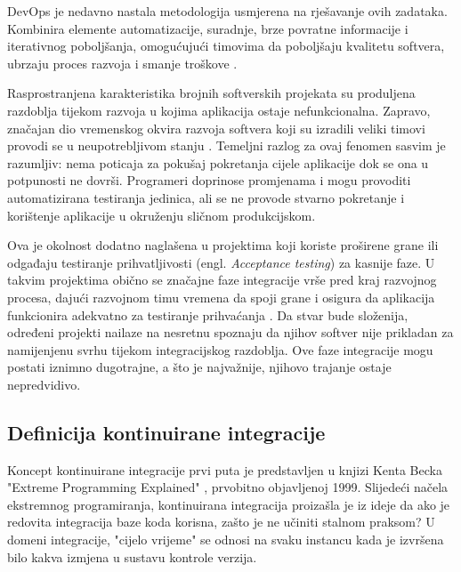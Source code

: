 \documentclass[a4paper,12pt,oneside]{article}
\begin{document}
DevOps je nedavno nastala metodologija usmjerena na rješavanje ovih zadataka. Kombinira elemente automatizacije, suradnje, brze povratne informacije i iterativnog poboljšanja, omogućujući timovima da poboljšaju kvalitetu softvera, ubrzaju proces razvoja i smanje troškove \cite{cowell2023automating}. 
 
Rasprostranjena karakteristika brojnih softverskih projekata su produljena razdoblja tijekom razvoja u kojima aplikacija ostaje nefunkcionalna. Zapravo, značajan dio vremenskog okvira razvoja softvera koji su izradili veliki timovi provodi se u neupotrebljivom stanju \cite{humble2010continuous}. Temeljni razlog za ovaj fenomen sasvim je razumljiv: nema poticaja za pokušaj pokretanja cijele aplikacije dok se ona u potpunosti ne dovrši. Programeri doprinose promjenama i mogu provoditi automatizirana testiranja jedinica, ali se ne provode stvarno pokretanje i korištenje aplikacije u okruženju sličnom produkcijskom.

Ova je okolnost dodatno naglašena u projektima koji koriste proširene grane ili odgađaju testiranje prihvatljivosti (engl. \textit{Acceptance testing}) za kasnije faze. U takvim projektima obično se značajne faze integracije vrše pred kraj razvojnog procesa, dajući razvojnom timu vremena da spoji grane i osigura da aplikacija funkcionira adekvatno za testiranje prihvaćanja \cite{humble2010continuous}. Da stvar bude složenija, određeni projekti nailaze na nesretnu spoznaju da njihov softver nije prikladan za namijenjenu svrhu tijekom integracijskog razdoblja. Ove faze integracije mogu postati iznimno dugotrajne, a što je najvažnije, njihovo trajanje ostaje nepredvidivo.

\subsection{Definicija kontinuirane integracije}
Koncept kontinuirane integracije prvi puta je predstavljen u knjizi Kenta Becka "Extreme Programming Explained" \cite{beck2000extreme}, prvobitno objavljenoj 1999. Slijedeći načela ekstremnog programiranja, kontinuirana integracija proizašla je iz ideje da ako je redovita integracija baze koda korisna, zašto je ne učiniti stalnom praksom? U domeni integracije, "cijelo vrijeme" se odnosi na svaku instancu kada je izvršena bilo kakva izmjena u sustavu kontrole verzija.
\end{document}
